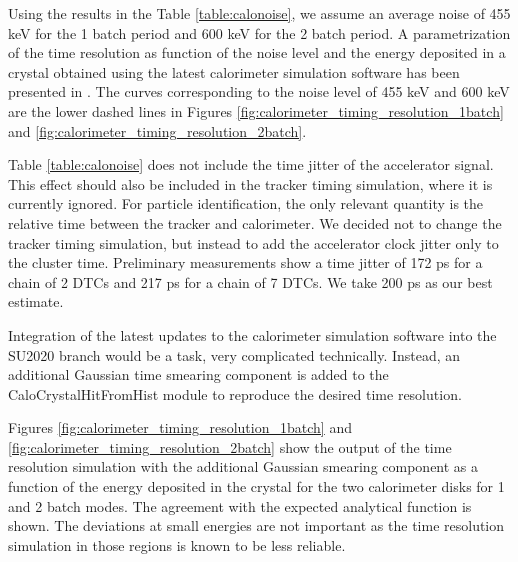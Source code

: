 Using the results in the Table \ref{table:calonoise}, we assume an average noise of 455 keV
for the 1 batch period and 600 keV for the 2 batch period. 
A parametrization of the time resolution as function of the noise level and the energy deposited
in a crystal obtained using the latest calorimeter simulation software has been presented in  \cite{MU2E_36225_CALO_TIME_RES}.
The curves corresponding to the noise level of 455 keV and 600 keV are the lower dashed
lines in Figures \ref{fig:calorimeter_timing_resolution_1batch} and  \ref{fig:calorimeter_timing_resolution_2batch}.

Table \ref{table:calonoise} does not include the time jitter of the accelerator signal.
This effect should also be included in the tracker timing simulation, where it is currently
ignored. For particle identification, the only relevant quantity is the relative time
between the tracker and calorimeter. 
We decided not to change the tracker timing simulation, but instead to add the accelerator
clock jitter only to the cluster time.
Preliminary measurements \cite{MU2E_35392_TIME_JITTER} show a time jitter of 172 ps
for a chain of 2 DTCs and 217 ps for a chain of 7 DTCs. We take 200 ps as our best estimate.

Integration of the latest updates to the calorimeter simulation software into the SU2020 branch
would be a task, very complicated technically. Instead, an additional Gaussian time smearing
component is added to the  CaloCrystalHitFromHist module to reproduce the desired time resolution. 

Figures \ref{fig:calorimeter_timing_resolution_1batch} and  \ref{fig:calorimeter_timing_resolution_2batch} show the output of the time resolution
simulation with the additional Gaussian smearing component as a function of the energy deposited
in the crystal for the two calorimeter disks for 1 and 2 batch modes.
The agreement with the expected analytical function is shown. 
The deviations at small energies are not important as the time resolution simulation
in those regions is known to be less reliable.


